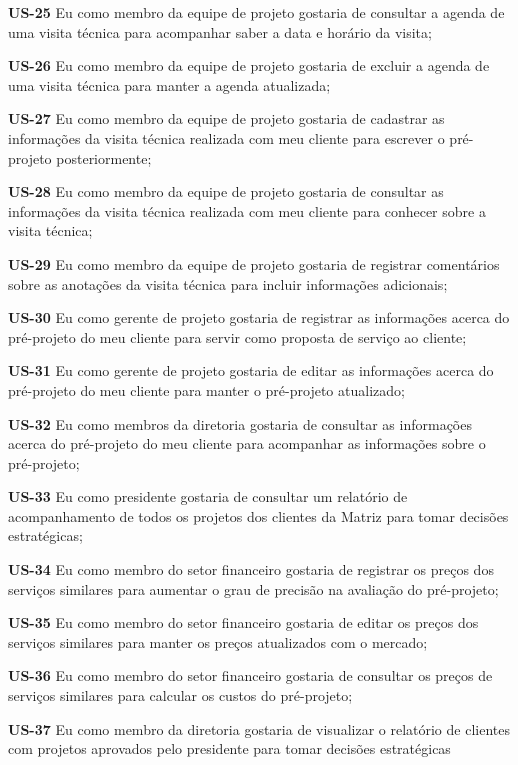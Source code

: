 \textbf{US-25} Eu como membro da equipe de projeto gostaria de consultar a agenda de uma visita técnica para acompanhar saber a data e horário da visita;


\textbf{US-26} Eu como membro da equipe de projeto gostaria de excluir a agenda de uma visita técnica para manter a agenda atualizada;


\textbf{US-27} Eu como membro da equipe de projeto gostaria de cadastrar as informações da visita técnica realizada com meu cliente para escrever o pré-projeto posteriormente;


\textbf{US-28} Eu como membro da equipe de projeto gostaria de consultar as informações da visita técnica realizada com meu cliente para conhecer sobre a visita técnica;


\textbf{US-29} Eu como membro da equipe de projeto gostaria de registrar comentários sobre as anotações da visita técnica para incluir informações adicionais;


\textbf{US-30} Eu como gerente de projeto gostaria de registrar as informações acerca do pré-projeto do meu cliente para servir como proposta de serviço ao cliente;


\textbf{US-31} Eu como gerente de projeto gostaria de editar as informações acerca do pré-projeto do meu cliente para manter o pré-projeto atualizado;


\textbf{US-32} Eu como membros da diretoria gostaria de consultar as informações acerca do pré-projeto do meu cliente para acompanhar as informações sobre o pré-projeto;


\textbf{US-33} Eu como presidente gostaria de consultar um relatório de acompanhamento de todos os projetos dos clientes da Matriz para tomar decisões estratégicas;


\textbf{US-34} Eu como membro do setor financeiro gostaria de registrar os preços dos serviços similares para aumentar o grau de precisão na avaliação do pré-projeto;


\textbf{US-35} Eu como membro do setor financeiro gostaria de editar os preços dos serviços similares para manter os preços atualizados com o mercado;


\textbf{US-36} Eu como membro do setor financeiro gostaria de consultar os preços de serviços similares para calcular os custos do pré-projeto;


\textbf{US-37} Eu como membro da diretoria gostaria de visualizar o relatório de clientes com projetos aprovados pelo presidente para tomar decisões estratégicas


